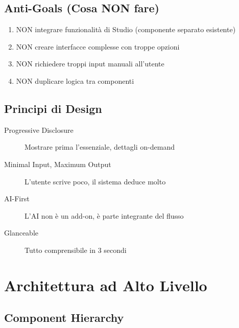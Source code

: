 \documentclass[11pt,a4paper]{article}
\begin{document}
\subsection{Anti-Goals (Cosa NON fare)}

\begin{enumerate}
    \item NON integrare funzionalità di Studio (componente separato esistente)
    \item NON creare interfacce complesse con troppe opzioni
    \item NON richiedere troppi input manuali all'utente
    \item NON duplicare logica tra componenti
\end{enumerate}

\subsection{Principi di Design}

\begin{description}
    \item[Progressive Disclosure] Mostrare prima l'essenziale, dettagli on-demand
    \item[Minimal Input, Maximum Output] L'utente scrive poco, il sistema deduce molto
    \item[AI-First] L'AI non è un add-on, è parte integrante del flusso
    \item[Glanceable] Tutto comprensibile in 3 secondi
\end{description}

\newpage



\section{Architettura ad Alto Livello}

\subsection{Component Hierarchy}
\end{document}

